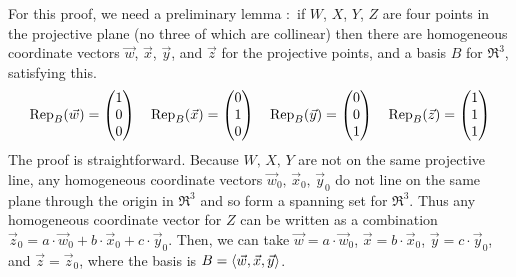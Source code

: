 For this proof, we need a preliminary lemma \cite{Coxeter}:~if 
$W$, $X$, $Y$, $Z$ are four points in the projective plane 
(no three of which are collinear)
then there are homogeneous coordinate
vectors $\vec{w}$, $\vec{x}$, $\vec{y}$, and $\vec{z}$
for the projective points, and a basis $B$ for $\Re^3$, 
satisfying this. 
\begin{equation*}
  \rep{\vec{w}}{B}=\colvec{1 \\ 0 \\ 0}
  \quad
  \rep{\vec{x}}{B}=\colvec{0 \\ 1 \\ 0}
  \quad
  \rep{\vec{y}}{B}=\colvec{0 \\ 0 \\ 1}
  \quad
  \rep{\vec{z}}{B}=\colvec{1 \\ 1 \\ 1}
\end{equation*}
The proof is straightforward.
Because $W,\,X,\,Y$ are not on the same projective line, any
homogeneous coordinate vectors 
$\vec{w}_0,\,\vec{x}_0,\,\vec{y}_0$ do not line on the same
plane through the origin in $\Re^3$ and so form a 
spanning set for $\Re^3$.
Thus any homogeneous coordinate vector for $Z$ can be
written as a combination 
$\vec{z}_0=a\cdot\vec{w}_0+b\cdot\vec{x}_0+c\cdot\vec{y}_0$.
Then,  we can take 
$\vec{w}=a\cdot\vec{w}_0$,
$\vec{x}=b\cdot\vec{x}_0$,
$\vec{y}=c\cdot\vec{y}_0$,
and $\vec{z}=\vec{z}_0$, where the basis is 
$B=\sequence{\vec{w},\vec{x},\vec{y}}$.  

